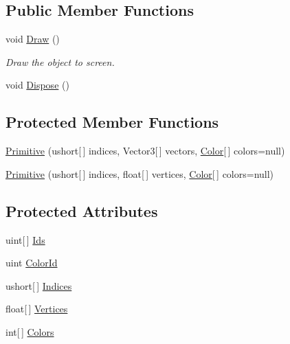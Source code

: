 \subsection*{Public Member Functions}
\begin{DoxyCompactItemize}
\item 
void \hyperlink{class_tri_devs_1_1_tri_engine2_d_1_1_graphics_1_1_primitive_a6b70bbcf294c96c757a9fc8f1ae09dd8}{Draw} ()
\begin{DoxyCompactList}\small\item\em Draw the object to screen. \end{DoxyCompactList}\item 
void \hyperlink{class_tri_devs_1_1_tri_engine2_d_1_1_graphics_1_1_primitive_ae9844a28980c7d251206d7a98b41b153}{Dispose} ()
\end{DoxyCompactItemize}
\subsection*{Protected Member Functions}
\begin{DoxyCompactItemize}
\item 
\hyperlink{class_tri_devs_1_1_tri_engine2_d_1_1_graphics_1_1_primitive_adaded6f66aeba575d09c8d31baeb6a28}{Primitive} (ushort\mbox{[}$\,$\mbox{]} indices, Vector3\mbox{[}$\,$\mbox{]} vectors, \hyperlink{struct_tri_devs_1_1_tri_engine2_d_1_1_color}{Color}\mbox{[}$\,$\mbox{]} colors=null)
\item 
\hyperlink{class_tri_devs_1_1_tri_engine2_d_1_1_graphics_1_1_primitive_a670d9f856454494b22434b79f57803b9}{Primitive} (ushort\mbox{[}$\,$\mbox{]} indices, float\mbox{[}$\,$\mbox{]} vertices, \hyperlink{struct_tri_devs_1_1_tri_engine2_d_1_1_color}{Color}\mbox{[}$\,$\mbox{]} colors=null)
\end{DoxyCompactItemize}
\subsection*{Protected Attributes}
\begin{DoxyCompactItemize}
\item 
uint\mbox{[}$\,$\mbox{]} \hyperlink{class_tri_devs_1_1_tri_engine2_d_1_1_graphics_1_1_primitive_a64b2622a8f8e5c6726fd0e246f55154f}{Ids}
\item 
uint \hyperlink{class_tri_devs_1_1_tri_engine2_d_1_1_graphics_1_1_primitive_ac72a7d65827cbd174142493bf660af73}{Color\-Id}
\item 
ushort\mbox{[}$\,$\mbox{]} \hyperlink{class_tri_devs_1_1_tri_engine2_d_1_1_graphics_1_1_primitive_a61d1e5ea5ec5236f27a0282a96df7396}{Indices}
\item 
float\mbox{[}$\,$\mbox{]} \hyperlink{class_tri_devs_1_1_tri_engine2_d_1_1_graphics_1_1_primitive_a04b2caa85d31b4dd377f171845d49d15}{Vertices}
\item 
int\mbox{[}$\,$\mbox{]} \hyperlink{class_tri_devs_1_1_tri_engine2_d_1_1_graphics_1_1_primitive_a0a42a026f0c0617ae79240131f089e39}{Colors}
\end{DoxyCompactItemize}
